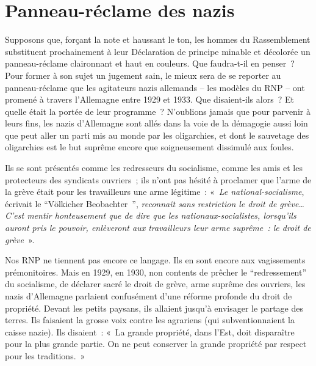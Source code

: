 \documentclass[french,twoside]{book} %
\begin{document}
\section[{Panneau-réclame des nazis}]{Panneau-réclame des nazis}
\noindent Supposons que, forçant la note et haussant le ton, les hommes du Rassemblement substituent prochainement à leur Déclaration de principe minable et décolorée un panneau-réclame claironnant et haut en couleurs. Que faudra-t-il en penser ? Pour former à son sujet un jugement sain, le mieux sera de se reporter au panneau-réclame que les agitateurs nazis allemands – les modèles du RNP – ont promené à travers l’Allemagne entre 1929 et 1933. Que disaient-ils alors ? Et quelle était la portée de leur programme ? N’oublions jamais que pour parvenir à leurs fins, les nazis d’Allemagne sont allés dans la voie de la démagogie aussi loin que peut aller un parti mis au monde par les oligarchies, et dont le sauvetage des oligarchies est le but suprême encore que soigneusement dissimulé aux foules.\par
Ils se sont présentés comme les redresseurs du socialisme, comme les amis et les protecteurs des syndicats ouvriers ; ils n’ont pas hésité à proclamer que l’arme de la grève était pour les travailleurs une arme légitime : « \emph{Le national-socialisme}, écrivait le “Völkicher Beobachter ”, \emph{reconnaît sans restriction le droit de grève… C’est mentir honteusement que de dire que les nationaux-socialistes, lorsqu’ils auront pris le pouvoir, enlèveront aux travailleurs leur arme suprême : le droit de grève} ».\par
Nos RNP ne tiennent pas encore ce langage. Ils en sont encore aux vagissements prémonitoires. Mais en 1929, en 1930, non contents de prêcher le “redressement” du socialisme, de déclarer sacré le droit de grève, arme suprême des ouvriers, les nazis d’Allemagne parlaient confusément d’une réforme profonde du droit de propriété. Devant les petits paysans, ils allaient jusqu’à envisager le partage des terres. Ils faisaient la grosse voix contre les agrariens (qui subventionnaient la caisse nazie). Ils disaient : « La grande propriété, dans l’Est, doit disparaître pour la plus grande partie. On ne peut conserver la grande propriété par respect pour les traditions. »
\end{document}
